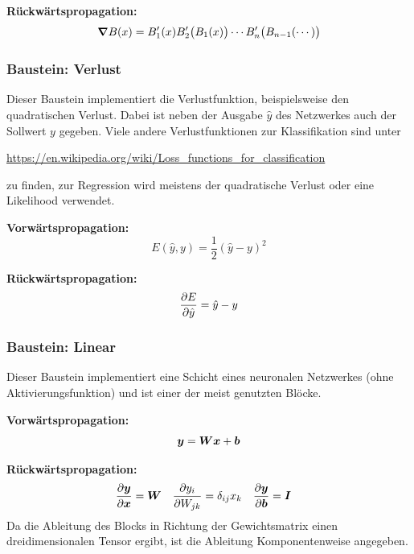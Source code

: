 				\textbf{Rückwärtspropagation:}
				\begin{equation}
					\grad{B}(x) = B_1'(x) B_2'\bigl( B_1(x) \bigr) \cdots B_n'\bigl( B_{n - 1}(\cdots) \bigr)
				\end{equation}

			\subsubsection{Baustein: Verlust}
				Dieser Baustein implementiert die Verlustfunktion, beispielsweise den quadratischen Verlust. Dabei ist neben der Ausgabe \(\hat{y}\) des Netzwerkes auch der Sollwert \(y\) gegeben. Viele andere Verlustfunktionen zur Klassifikation sind unter
				\begin{center}
					\url{https://en.wikipedia.org/wiki/Loss_functions_for_classification}
				\end{center}
				zu finden, zur Regression wird meistens der quadratische Verlust oder eine Likelihood verwendet.

				\textbf{Vorwärtspropagation:}
				\begin{equation}
					E(\hat{y}, y) = \frac{1}{2} (\hat{y} - y)^2
				\end{equation}

				\textbf{Rückwärtspropagation:}
				\begin{equation}
					\pdv{E}{\hat{y}} = \hat{y} - y
				\end{equation}

			\subsubsection{Baustein: Linear}
				Dieser Baustein implementiert eine Schicht eines neuronalen Netzwerkes (ohne Aktivierungsfunktion) und ist einer der meist genutzten Blöcke.

				\textbf{Vorwärtspropagation:}
				\begin{equation}
					\bm{y} = \bm{W} \bm{x} + \bm{b}
				\end{equation}

				\textbf{Rückwärtspropagation:}
				\begin{align}
					\pdv{\bm{y}}{\bm{x}} &= \bm{W} &
					\pdv{y_i}{W_{jk}} &= \delta_{ij} x_k &
					\pdv{\bm{y}}{\bm{b}} &= \bm{I}
				\end{align}
				Da die Ableitung des Blocks in Richtung der Gewichtsmatrix einen dreidimensionalen Tensor ergibt, ist die Ableitung Komponentenweise angegeben.

